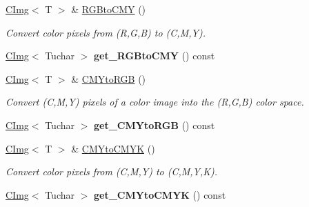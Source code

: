 \begin{DoxyCompactItemize}
\item 
\hypertarget{structcimg__library_1_1CImg_a2a5e7725a4aafab45bfecc7c31987aca}{
\hyperlink{structcimg__library_1_1CImg}{CImg}$<$ T $>$ \& \hyperlink{structcimg__library_1_1CImg_a2a5e7725a4aafab45bfecc7c31987aca}{RGBtoCMY} ()}
\label{structcimg__library_1_1CImg_a2a5e7725a4aafab45bfecc7c31987aca}

\begin{DoxyCompactList}\small\item\em Convert color pixels from (R,G,B) to (C,M,Y). \item\end{DoxyCompactList}\item 
\hypertarget{structcimg__library_1_1CImg_acd42723e61532e2c05e7de72841461b4}{
\hyperlink{structcimg__library_1_1CImg}{CImg}$<$ Tuchar $>$ {\bfseries get\_\-RGBtoCMY} () const }
\label{structcimg__library_1_1CImg_acd42723e61532e2c05e7de72841461b4}

\item 
\hypertarget{structcimg__library_1_1CImg_af44e7452ef72387ee411a48e8fd8f2c6}{
\hyperlink{structcimg__library_1_1CImg}{CImg}$<$ T $>$ \& \hyperlink{structcimg__library_1_1CImg_af44e7452ef72387ee411a48e8fd8f2c6}{CMYtoRGB} ()}
\label{structcimg__library_1_1CImg_af44e7452ef72387ee411a48e8fd8f2c6}

\begin{DoxyCompactList}\small\item\em Convert (C,M,Y) pixels of a color image into the (R,G,B) color space. \item\end{DoxyCompactList}\item 
\hypertarget{structcimg__library_1_1CImg_aad54233cf16a565436463a601c8b9bfb}{
\hyperlink{structcimg__library_1_1CImg}{CImg}$<$ Tuchar $>$ {\bfseries get\_\-CMYtoRGB} () const }
\label{structcimg__library_1_1CImg_aad54233cf16a565436463a601c8b9bfb}

\item 
\hypertarget{structcimg__library_1_1CImg_a86448a9b36330cd1cdca41310714c82c}{
\hyperlink{structcimg__library_1_1CImg}{CImg}$<$ T $>$ \& \hyperlink{structcimg__library_1_1CImg_a86448a9b36330cd1cdca41310714c82c}{CMYtoCMYK} ()}
\label{structcimg__library_1_1CImg_a86448a9b36330cd1cdca41310714c82c}

\begin{DoxyCompactList}\small\item\em Convert color pixels from (C,M,Y) to (C,M,Y,K). \item\end{DoxyCompactList}\item 
\hypertarget{structcimg__library_1_1CImg_a79739beb080a26a96436c79671030685}{
\hyperlink{structcimg__library_1_1CImg}{CImg}$<$ Tuchar $>$ {\bfseries get\_\-CMYtoCMYK} () const }
\label{structcimg__library_1_1CImg_a79739beb080a26a96436c79671030685}


\end{DoxyCompactItemize}
